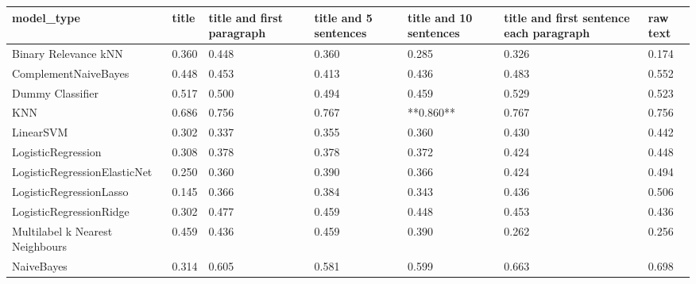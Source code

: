 \begin{tabular}{lllllll}
\toprule
                     model\_type & title & title and first paragraph & title and 5 sentences & title and 10 sentences & title and first sentence each paragraph & raw text \\
\midrule
           Binary Relevance kNN & 0.360 &                     0.448 &                 0.360 &                  0.285 &                                   0.326 &    0.174 \\
           ComplementNaiveBayes & 0.448 &                     0.453 &                 0.413 &                  0.436 &                                   0.483 &    0.552 \\
               Dummy Classifier & 0.517 &                     0.500 &                 0.494 &                  0.459 &                                   0.529 &    0.523 \\
                            KNN & 0.686 &                     0.756 &                 0.767 &              **0.860** &                                   0.767 &    0.756 \\
                      LinearSVM & 0.302 &                     0.337 &                 0.355 &                  0.360 &                                   0.430 &    0.442 \\
             LogisticRegression & 0.308 &                     0.378 &                 0.378 &                  0.372 &                                   0.424 &    0.448 \\
   LogisticRegressionElasticNet & 0.250 &                     0.360 &                 0.390 &                  0.366 &                                   0.424 &    0.494 \\
        LogisticRegressionLasso & 0.145 &                     0.366 &                 0.384 &                  0.343 &                                   0.436 &    0.506 \\
        LogisticRegressionRidge & 0.302 &                     0.477 &                 0.459 &                  0.448 &                                   0.453 &    0.436 \\
Multilabel k Nearest Neighbours & 0.459 &                     0.436 &                 0.459 &                  0.390 &                                   0.262 &    0.256 \\
                     NaiveBayes & 0.314 &                     0.605 &                 0.581 &                  0.599 &                                   0.663 &    0.698 \\

\end{tabular}

